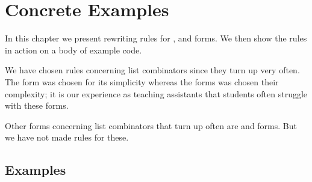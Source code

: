 \chapter{Concrete Examples}
In this chapter we present rewriting rules for ,  and
 forms. We then show the rules in action on a body of example code.

We have chosen rules concerning list combinators since they turn up very
often. The  form was chosen for its simplicity whereas the
 forms was chosen their complexity; it is our experience as
teaching assistants that students often struggle with these forms.

Other forms concerning list combinators that turn up often are  and
 forms. But we have not made rules for these.



\section{Examples}





